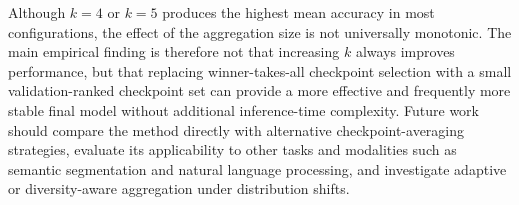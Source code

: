 \documentclass[runningheads]{llncs}
\begin{document}
Although $k=4$ or $k=5$ produces the highest mean accuracy in most
configurations, the effect of the aggregation size is not universally
monotonic. The main empirical finding is therefore not that increasing $k$
always improves performance, but that replacing winner-takes-all checkpoint
selection with a small validation-ranked checkpoint set can provide a more
effective and frequently more stable final model without additional
inference-time complexity. Future work should compare the method directly
with alternative checkpoint-averaging strategies, evaluate its applicability
to other tasks and modalities such as semantic segmentation and natural
language processing, and investigate adaptive or diversity-aware aggregation
under distribution shifts.



\end{document}
